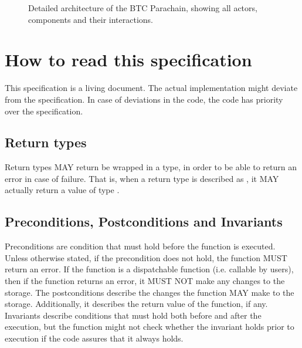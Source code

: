 \documentclass[a4paper,10pt,english]{sphinxmanual}
\begin{document}
\begin{figure}[htbp]
\centering
\capstart

\noindent{}
\caption{Detailed architecture of the BTC Parachain, showing all actors, components and their interactions.}\label{\detokenize{intro/architecture:id3}}\label{\detokenize{intro/architecture:fig-interactions}}\end{figure}


\chapter{How to read this specification}
\label{\detokenize{spec/introduction:how-to-read-this-specification}}\label{\detokenize{spec/introduction::doc}}
This specification is a living document. The actual implementation might deviate from the specification. In case of deviations in the code, the code has priority over the specification.


\section{Return types}
\label{\detokenize{spec/introduction:return-types}}
Return types MAY return be wrapped in a  type, in order to be able to return an error in case of failure. That is, when a return type is described as , it MAY actually return a value of type .


\section{Preconditions, Postconditions and Invariants}
\label{\detokenize{spec/introduction:preconditions-postconditions-and-invariants}}
Preconditions are condition that must hold before the function is executed. Unless otherwise stated, if the precondition does not hold, the function MUST return an error. If the function is a dispatchable function (i.e. callable by users), then if the function returns an error, it MUST NOT make any changes to the storage. The postconditions describe the changes the function MAY make to the storage. Additionally, it describes the return value of the function, if any. Invariants describe conditions that must hold both before and after the execution, but the function might not check whether the invariant holds prior to execution if the code assures that it always holds.
\end{document}
